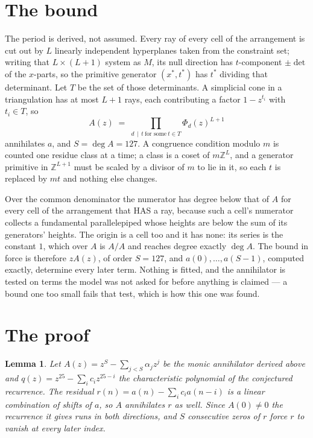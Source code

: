 \documentclass[11pt,a4paper]{article}
\theoremstyle{plain}
\newtheorem{lemma}[theorem]{Lemma}
\theoremstyle{definition}
\begin{document}
\section{The bound}

The period is derived, not assumed. Every ray of every cell of the arrangement is cut out by
$L$ linearly independent hyperplanes taken from the constraint set; writing that $L\times(L+1)$
system as $M$, its null direction has $t$-component $\pm\det$ of the $x$-parts, so the
primitive generator $(x^*,t^*)$ has $t^*$ dividing that determinant. Let $T$ be the set of
those determinants. A simplicial cone in a triangulation has at most $L+1$ rays, each
contributing a factor $1-z^{t_i}$ with $t_i\in T$, so
\[
A(z)\;=\;\prod_{d\,\mid\,t\ \text{for some}\ t\in T}\Phi_d(z)^{L+1}
\]
annihilates $a$, and $S=\deg A=127$. A congruence condition modulo $m$ is counted one residue
class at a time; a class is a coset of $m\mathbb{Z}^L$, and a generator primitive in
$\mathbb{Z}^{L+1}$ must be scaled by a divisor of $m$ to lie in it, so each $t$ is replaced
by $mt$ and nothing else changes.

Over the common denominator the numerator has degree below that of $A$ for every cell of the
arrangement that HAS a ray, because such a cell's numerator collects a fundamental
parallelepiped whose heights are below the sum of its generators' heights. The origin is a cell
too and it has none: its series is the constant $1$, which over $A$ is $A/A$ and reaches degree
exactly $\deg A$. The bound in force is therefore $zA(z)$, of order $S=127$, and
$a(0),\dots,a(S-1)$, computed exactly, determine every later term. Nothing is fitted, and the
annihilator is tested on terms the model was not asked for before anything is claimed --- a
bound one too small fails that test, which is how this one was found.

\section{The proof}

\begin{lemma}\label{lem:crit}
Let $A(z)=z^S-\sum_{j<S}\alpha_jz^{j}$ be the monic annihilator derived above and
$q(z)=z^{25}-\sum_ic_iz^{25-i}$ the characteristic polynomial of the conjectured
recurrence. The residual $r(n)=a(n)-\sum_ic_ia(n-i)$ is a linear combination of shifts of $a$,
so $A$ annihilates $r$ as well. Since $A(0)\ne0$ the recurrence it gives runs in both
directions, and $S$ consecutive zeros of $r$ force $r$ to vanish at every later index.
\end{lemma}
\end{document}
